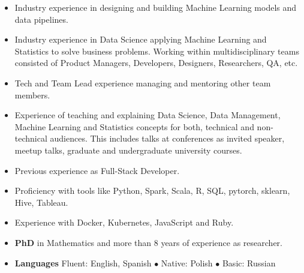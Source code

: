 \documentclass[a4paper, oneside]{scrreprt}
\begin{document}
\begin{itemize}
\item Industry experience in designing and building Machine Learning models and data
  pipelines.
\item Industry experience in Data Science applying Machine Learning and Statistics to solve business problems. Working within multidisciplinary teams consisted of Product Managers, Developers, Designers, Researchers, QA, etc.
\item Tech and Team Lead experience managing and mentoring other team members.
\item Experience of teaching and explaining Data Science, Data Management, Machine Learning and
  Statistics concepts for both, technical and non-technical audiences. This includes talks at
  conferences as invited speaker, meetup talks, graduate and undergraduate university courses.
\item Previous experience as Full-Stack Developer.
\item Proficiency with tools like Python, Spark, Scala, R, SQL, pytorch, sklearn, Hive, Tableau.
\item Experience with Docker, Kubernetes, JavaScript and Ruby. 
\item \textbf{PhD} in Mathematics and more than 8 years of experience as researcher. 
\item \textbf{Languages} Fluent: English, Spanish $\bullet$ Native: Polish  $\bullet$ Basic: Russian 
\end{itemize}
\noindent\makebox[\linewidth]{\rule{\textwidth}{0.4pt}}
\vspace{0.1cm}
\end{document}
